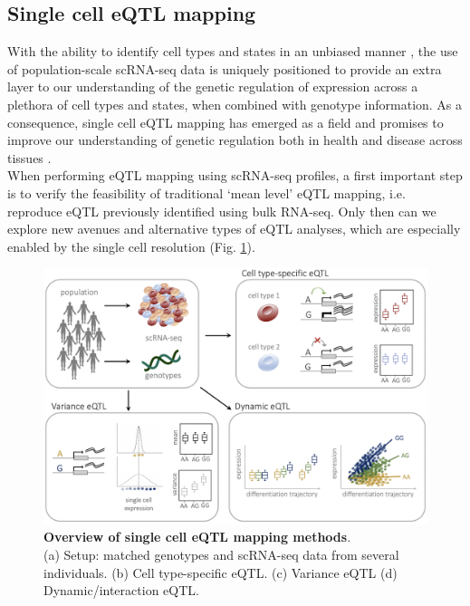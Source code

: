 \newpage

\subsection{Single cell eQTL mapping}

With the ability to identify cell types and states in an unbiased manner \cite{kolodziejczyk2015technology, trapnell2015defining}, the use of population-scale scRNA-seq data is uniquely positioned to provide an extra layer to our understanding of the genetic regulation of expression across a plethora of cell types and states, when combined with genotype information.
As a consequence, single cell eQTL mapping has emerged as a field and promises to improve our understanding of genetic regulation both in health and disease across tissues \cite{wills2013single, van2018single, kang2018multiplexed, sarkar2019discovery, cuomo2020single, jerber2020population, van2020single1}.\\

When performing eQTL mapping using scRNA-seq profiles, a first important step is to verify the feasibility of traditional `mean level' eQTL mapping, i.e. reproduce eQTL previously identified using bulk RNA-seq.
Only then can we explore new avenues and alternative types of eQTL analyses, which are especially enabled by the single cell resolution (Fig. \ref{fig:sc_eqtl}).

\begin{figure}[h]
\centering
\includegraphics[width=15cm]{Chapter3/Fig/sc_eqtl.png}
\caption[Single cell eQTL]{\textbf{Overview of single cell eQTL mapping methods}.\\
(a) Setup: matched genotypes and scRNA-seq data from several individuals.
(b) Cell type-specific eQTL.
(c) Variance eQTL
(d) Dynamic/interaction eQTL.}
\label{fig:sc_eqtl}
\end{figure}

